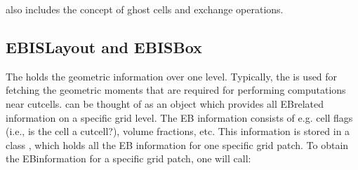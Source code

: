\documentclass[letterpaper,10pt,english]{sphinxmanual}
\begin{document}
\begin{sphinxVerbatim}[commandchars=\\\{\},formatcom=\scriptsize]
 
    
     \PYG{p}{[}\PYG{p}{]}
\end{sphinxVerbatim}

 also includes the concept of ghost cells and exchange operations.


\subsection{EBISLayout and EBISBox}
\label{\detokenize{Source/ChomboBasics:ebislayout-and-ebisbox}}
The  holds the geometric information over one  level.
Typically, the  is used for fetching the geometric moments that are required for performing computations near cut\sphinxhyphen{}cells.
 can be thought of as an object which provides all EB\sphinxhyphen{}related information on a specific grid level.
The EB information consists of e.g. cell flags (i.e., is the cell a cut\sphinxhyphen{}cell?), volume fractions, etc.
This information is stored in a class , which holds all the EB information for one specific grid patch.
To obtain the EB\sphinxhyphen{}information for a specific grid patch, one will call:

\begin{sphinxVerbatim}[commandchars=\\\{\},formatcom=\scriptsize]
 
    
      \PYG{p}{[}\PYG{p}{]}
\end{sphinxVerbatim}
\end{document}
